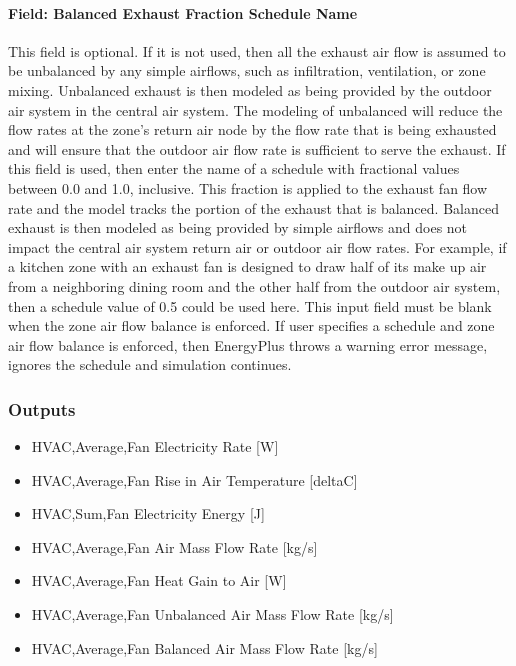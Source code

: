 \paragraph{Field: Balanced Exhaust Fraction Schedule Name}\label{field-balanced-exhaust-fraction-schedule-name}

This field is optional. If it is not used, then all the exhaust air flow is assumed to be unbalanced by any simple airflows, such as infiltration, ventilation, or zone mixing. Unbalanced exhaust is then modeled as being provided by the outdoor air system in the central air system. The modeling of unbalanced will reduce the flow rates at the zone's return air node by the flow rate that is being exhausted and will ensure that the outdoor air flow rate is sufficient to serve the exhaust. If this field is used, then enter the name of a schedule with fractional values between 0.0 and 1.0, inclusive. This fraction is applied to the exhaust fan flow rate and the model tracks the portion of the exhaust that is balanced. Balanced exhaust is then modeled as being provided by simple airflows and does not impact the central air system return air or outdoor air flow rates. For example, if a kitchen zone with an exhaust fan is designed to draw half of its make up air from a neighboring dining room and the other half from the outdoor air system, then a schedule value of 0.5 could be used here. This input field must be blank when the zone air flow balance is enforced. If user specifies a schedule and zone air flow balance is enforced, then EnergyPlus throws a warning error message, ignores the schedule and simulation continues.

\subsubsection{Outputs}\label{outputs-3-007}

\begin{itemize}
\item
  HVAC,Average,Fan Electricity Rate {[}W{]}
\item
  HVAC,Average,Fan Rise in Air Temperature {[}deltaC{]}
\item
  HVAC,Sum,Fan Electricity Energy {[}J{]}
\item
  HVAC,Average,Fan Air Mass Flow Rate {[}kg/s{]}
\item
  HVAC,Average,Fan Heat Gain to Air {[}W{]}
\item
  HVAC,Average,Fan Unbalanced Air Mass Flow Rate {[}kg/s{]}
\item
  HVAC,Average,Fan Balanced Air Mass Flow Rate {[}kg/s{]}
\end{itemize}

